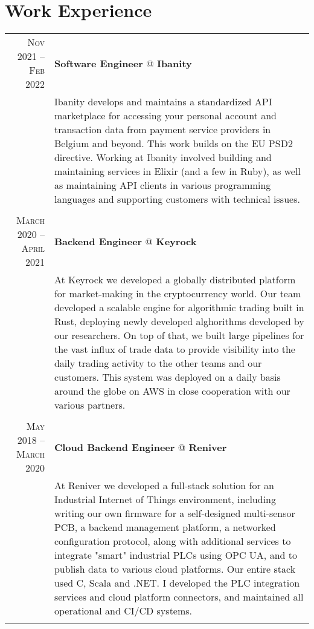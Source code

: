 \documentclass[a4paper,10pt]{article}
\begin{document}
\section{\textcolor{awesome-red}{Wor}k Experience}
\begin{tabular}{r|p{11cm}}

	\textsc{Nov 2021 – Feb 2022} & \textbf{Software Engineer} @ \textbf{Ibanity} \\ 
	& \footnotesize{Ibanity develops and maintains a standardized API marketplace for accessing your personal account and transaction data from payment service providers in Belgium and beyond. This work builds on the EU PSD2 directive. Working at Ibanity involved building and maintaining services in Elixir (and a few in Ruby), as well as maintaining API clients in various programming languages and supporting customers with technical issues.} \\
	\multicolumn{2}{c}{} \\
	
	
	\textsc{March 2020 – April 2021} & \textbf{Backend Engineer} @ \textbf{Keyrock} \\ 
	& \footnotesize{At Keyrock we developed a globally distributed platform for market-making in the cryptocurrency world. Our team developed a scalable engine for algorithmic trading built in Rust, deploying newly developed alghorithms developed by our researchers. On top of that, we built large pipelines for the vast influx of trade data to provide visibility into the daily trading activity to the other teams and our customers. This system was deployed on a daily basis around the globe on AWS in close cooperation with our various partners.} \\
	\multicolumn{2}{c}{} \\
	

	\textsc{May 2018 – March 2020} & \textbf{Cloud Backend Engineer} @ \textbf{Reniver} \\ 
	& \footnotesize{At Reniver we developed a full-stack solution for an Industrial Internet of Things environment, including writing our own firmware for a self-designed multi-sensor PCB, a backend management platform, a networked configuration protocol, along with additional services to integrate "smart" industrial PLCs using OPC UA, and to publish data to various cloud platforms. Our entire stack used C, Scala and .NET. I developed the PLC integration services and cloud platform connectors, and maintained all operational and CI/CD systems.} \\
	\multicolumn{2}{c}{} \\



\end{tabular}
\end{document}
